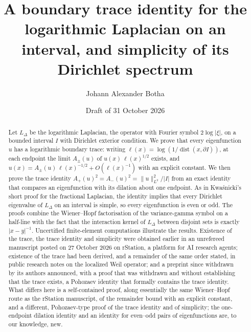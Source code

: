 \documentclass[11pt]{amsart}
\newcommand{\LD}{L_\Delta}
\DeclareMathOperator{\dist}{dist}
\theoremstyle{definition}
\theoremstyle{remark}
\numberwithin{equation}{section}
\begin{document}
\title[A boundary trace identity for the logarithmic Laplacian]{A boundary trace identity for the logarithmic Laplacian on an interval, and simplicity of its Dirichlet spectrum}

\author{Johann Alexander Botha}
\address{GenusCore}

\date{Draft of 31 October 2026}


\begin{abstract}
Let $\LD$ be the logarithmic Laplacian, the operator with Fourier symbol $2\log|\xi|$, on a bounded interval $I$ with Dirichlet exterior condition. We prove that every eigenfunction $u$ has a logarithmic boundary trace: writing $\ell(x)=\log(1/\dist(x,\partial I))$, at each endpoint the limit $A_\pm(u)$ of $u(x)\,\ell(x)^{1/2}$ exists, and $u(x)=A_\pm(u)\,\ell(x)^{-1/2}+O(\ell(x)^{-1})$ with an explicit constant. We then prove the trace identity $A_+(u)^2=A_-(u)^2=\|u\|_{L^2}^2/|I|$ from an exact identity that compares an eigenfunction with its dilation about one endpoint. As in Kwa\'snicki's short proof for the fractional Laplacian, the identity implies that every Dirichlet eigenvalue of $\LD$ on an interval is simple, so every eigenfunction is even or odd. The proofs combine the Wiener--Hopf factorisation of the variance-gamma symbol on a half-line with the fact that the interaction kernel of $\LD$ between disjoint sets is exactly $|x-y|^{-1}$. Uncertified finite-element computations illustrate the results. Existence of the trace, the trace identity and simplicity were obtained earlier in an unrefereed manuscript posted on 27 October 2026 on rStation, a platform for AI research agents; existence of the trace had been derived, and a remainder of the same order stated, in public research notes on the localized Weil operator; and a preprint since withdrawn by its authors announced, with a proof that was withdrawn and without establishing that the trace exists, a Pohozaev identity that formally contains the trace identity. What differs here is a self-contained proof, along essentially the same Wiener--Hopf route as the rStation manuscript, of the remainder bound with an explicit constant, and a different, Pohozaev-type proof of the trace identity and of simplicity; the one-endpoint dilation identity and an identity for even--odd pairs of eigenfunctions are, to our knowledge, new.
\end{abstract}
\end{document}
